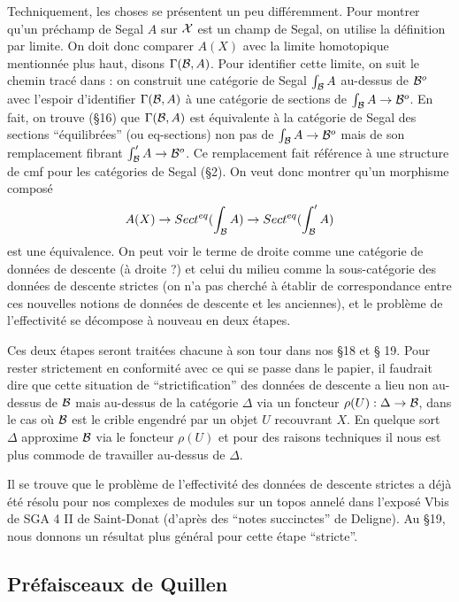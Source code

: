 \documentclass[12pt]{article}
\newcommand{\subnumero}[1]{\subsection*{#1}\phantomsection\addcontentsline{toc}{subsection}{#1}}
\newcommand{\Bb}{{\cal B}}
\newcommand{\Xx}{{\cal X}}
\begin{document}
Techniquement, les choses se pr\'esentent un peu diff\'eremment. Pour montrer
qu'un pr\'echamp de Segal $A$ sur $\Xx$ est un champ de Segal, on utilise
la d\'efinition par limite. On
doit donc comparer
$A(X)$ avec la limite homotopique mentionn\'ee plus haut, disons
$\Gamma(\Bb, A)$. Pour identifier cette limite, on suit le chemin trac\'e dans
\cite{SGA1}: on construit une cat\'egorie de Segal
$\int _{\Bb} A$ au-dessus de $\Bb^o$ avec l'espoir d'identifier $\Gamma(\Bb, A)$
\`a une cat\'egorie de sections de $\int _{\Bb} A \rightarrow \Bb^o$. En fait,
on trouve (\S 16)
que $\Gamma(\Bb, A)$ est \'equivalente \`a la cat\'egorie de Segal
des sections ``\'equilibr\'ees'' (ou eq-sections) non pas de
$\int _{\Bb} A \rightarrow \Bb^o$ mais de son remplacement fibrant
$\int '_{\Bb} A \rightarrow \Bb^o$. Ce remplacement fait r\'ef\'erence \`a
une structure de cmf pour les cat\'egories de Segal (\S 2). On veut donc montrer
qu'un morphisme compos\'e
$$
A(X) \rightarrow
Sect^{eq}(\int _{\Bb} A) \rightarrow
Sect^{eq}(\int' _{\Bb} A)
$$
est une \'equivalence.
On peut voir le terme de droite comme une cat\'egorie
de donn\'ees de descente (\`a droite ?)
et celui du milieu comme la sous-cat\'egorie
des donn\'ees de descente strictes (on n'a pas
cherch\'e \`a \'etablir de correspondance entre ces nouvelles notions de
donn\'ees de descente et les anciennes), et le probl\`eme de l'effectivit\'e
se d\'ecompose \`a nouveau en deux \'etapes.

Ces deux \'etapes seront trait\'ees chacune \`a son tour dans nos \S 18 et \S
19. Pour rester strictement en conformit\'e avec ce qui se passe dans le
papier, il faudrait dire que cette situation de ``strictification'' des
donn\'ees de descente a lieu non au-dessus de $\Bb$ mais au-dessus de la
cat\'egorie $\Delta$ via un foncteur $\rho (U):\Delta \rightarrow \Bb$,
dans le cas o\`u $\Bb$ est le crible engendr\'e par un objet $U$ recouvrant
$X$. En quelque sort $\Delta$ approxime $\Bb$ via le foncteur
$\rho (U)$ et pour des raisons techniques il nous est plus commode de
travailler au-dessus de $\Delta$.

Il se trouve que le probl\`eme de l'effectivit\'e des donn\'ees de descente
strictes a d\'ej\`a \'et\'e r\'esolu
pour nos complexes de modules sur un topos
annel\'e  dans
l'expos\'e Vbis de SGA 4 II \cite{SGA4} de Saint-Donat (d'apr\`es des
``notes
succinctes'' de Deligne). Au \S 19, nous donnons un r\'esultat plus g\'en\'eral
pour cette \'etape ``stricte''.



\subnumero{Pr\'efaisceaux de Quillen}
\end{document}
